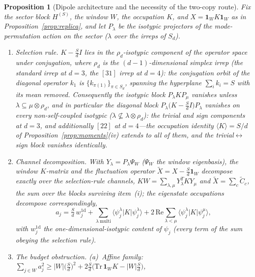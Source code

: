 \documentclass[11pt,a4paper]{article}
\theoremstyle{plain}
\newtheorem{proposition}[theorem]{Proposition}
\theoremstyle{definition}
\theoremstyle{remark}
\begin{document}
\begin{proposition}[Dipole architecture and the necessity of the two-copy
route]\label{prop:dipole}
Fix the sector block $H^{(S)}$, the window $W$, the occupation $K$, and
$X=\mathbf{1}_WK\mathbf{1}_W$ as in Proposition~\ref{prop:replica}, and let
$P_{\lambda}$ be the isotypic projectors of the mode-permutation action on
the sector ($\lambda$ over the irreps of $S_d$).
\begin{enumerate}[leftmargin=1.6em]
\item \emph{Selection rule.} $K-\tfrac{S}{d}I$ lies in the
$\rho_d$-isotypic component of the operator space under conjugation, where
$\rho_d$ is the $(d-1)$-dimensional simplex irrep (the standard irrep at
$d=3$, the $[31]$ irrep at $d=4$): the conjugation orbit of the diagonal
operator $k_1$ is $\{k_{\pi(1)}\}_{\pi\in S_d}$, spanning the hyperplane
$\sum_ik_i=S$ with its mean removed. Consequently the isotypic block
$P_{\lambda}KP_{\mu}$ vanishes unless $\lambda\subseteq\mu\otimes\rho_d$,
and in particular the diagonal block
$P_{\lambda}\bigl(K-\tfrac{S}{d}I\bigr)P_{\lambda}$ vanishes on every
\emph{non-self-coupled} isotypic ($\lambda\not\subseteq\lambda\otimes
\rho_d$): the trivial and sign components at $d=3$, and additionally $[22]$
at $d=4$---the occupation identity $\langle K\rangle=S/d$ of
Proposition~\ref{prop:moments}(iv) extends to all of them, and the
trivial$\leftrightarrow$sign block vanishes identically.
\item \emph{Channel decomposition.} With $Y_{\lambda}=P_{\lambda}\Psi_W$
($\Psi_W$ the window eigenbasis), the window $K$-matrix and the
fluctuation operator $\widetilde X=X-\tfrac{S}{d}\mathbf{1}_W$ decompose
exactly over the selection-rule channels,
$KW=\sum_{\lambda,\mu}Y_{\lambda}^{T}KY_{\mu}$ and
$\widetilde X=\sum_c\widetilde C_c$, the sum over the blocks surviving
item~(i); the eigenstate occupations decompose correspondingly,
\begin{equation*}
a_j=\tfrac{S}{d}\,w^{\mathrm{1d}}_j+\textstyle\sum_{\lambda\ \mathrm{multi}}
\langle\psi_j^{\lambda}|K|\psi_j^{\lambda}\rangle
+2\,\mathrm{Re}\sum_{\lambda<\mu}\langle\psi_j^{\lambda}|K|
\psi_j^{\mu}\rangle,
\end{equation*}
with $w^{\mathrm{1d}}_j$ the one-dimensional-isotypic content of
$\psi_j$ (every term of the sum obeying the selection rule).
\item \emph{The budget obstruction.} (a)~\emph{Affine family:}
$\sum_{j\in W}a_j^{2}\ge|W|\bigl(\tfrac{S}{d}\bigr)^{2}
+2\tfrac{S}{d}\bigl(\mathrm{Tr}\,\mathbf{1}_WK-|W|\tfrac{S}{d}\bigr)$,

\end{enumerate}
\end{proposition}
\end{document}
